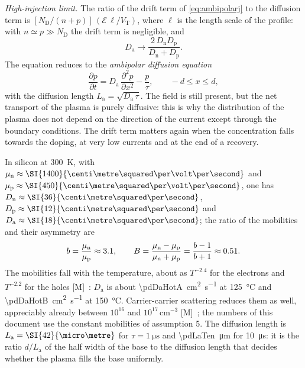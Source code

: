 \documentclass[10pt,a4paper]{scrartcl}
\newcommand{\VT}{V_\mathrm{T}}
\newcommand{\Ef}{\mathcal{E}}                 %
\newcommand{\ND}{N_\mathrm{D}}
\newcommand{\Da}{D_\mathrm{a}}
\newcommand{\La}{L_\mathrm{a}}
\newcommand{\Dn}{D_\mathrm{n}}
\newcommand{\Dp}{D_\mathrm{p}}
\newcommand{\mun}{\mu_\mathrm{n}}
\newcommand{\mup}{\mu_\mathrm{p}}
\newcommand{\cmc}{\si{\centi\metre^{-3}}}
\newcommand{\dpar}[2]{\frac{\partial #1}{\partial #2}}
\newcommand{\dparq}[2]{\frac{\partial^2 #1}{\partial #2^2}}
\begin{document}
\emph{High-injection limit.} The ratio of the drift term of \eqref{eq:ambipolarj} to the diffusion term is $[\ND/(n+p)]\,(\Ef\,\ell/\VT)$, where $\ell$ is the length scale of the profile: with $n \simeq p \gg \ND$ the drift term is negligible, and
\begin{equation}
\Da \longrightarrow \frac{2\,\Dn\Dp}{\Dn + \Dp} .
\label{eq:da}
\end{equation}
The equation reduces to the \emph{ambipolar diffusion equation}
\begin{equation}
\dpar{p}{t} = \Da\,\dparq{p}{x} - \frac{p}{\tau} , \qquad -d \leq x \leq d ,
\label{eq:diffusion}
\end{equation}
with the diffusion length $\La = \sqrt{\Da\,\tau}$. The field is still present, but the net transport of the plasma is purely diffusive: this is why the distribution of the plasma does not depend on the direction of the current except through the boundary conditions. The drift term matters again when the concentration falls towards the doping, at very low currents and at the end of a recovery.

In silicon at \SI{300}{\kelvin}, with $\mun \approx \SI{\pdMun}{\centi\metre\squared\per\volt\per\second}$ and $\mup \approx \SI{\pdMup}{\centi\metre\squared\per\volt\per\second}$, one has $\Dn \approx \SI{\pdDn}{\centi\metre\squared\per\second}$, $\Dp \approx \SI{\pdDp}{\centi\metre\squared\per\second}$ and $\Da \approx \SI{\pdDa}{\centi\metre\squared\per\second}$; the ratio of the mobilities and their asymmetry are
\begin{equation}
b = \frac{\mun}{\mup} \approx \pdBratio , \qquad B = \frac{\mun - \mup}{\mun + \mup} = \frac{b-1}{b+1} \approx \pdBmob .
\label{eq:bdef}
\end{equation}
The mobilities fall with the temperature, about as $T^{-2.4}$ for the electrons and $T^{-2.2}$ for the holes [M]~\cite{sze}: $\Da$ is about \SI{\pdDaHotA}{\centi\metre\squared\per\second} at \SI{125}{\celsius} and \SI{\pdDaHotB}{\centi\metre\squared\per\second} at \SI{150}{\celsius}. Carrier-carrier scattering reduces them as well, appreciably already between $10^{16}$ and $10^{17}\,\cmc$ [M]~\cite{lutz}; the numbers of this document use the constant mobilities of assumption 5. The diffusion length is $\La = \SI{\pdLaOne}{\micro\metre}$ for $\tau = \SI{1}{\micro\second}$ and \SI{\pdLaTen}{\micro\metre} for \SI{10}{\micro\second}: it is the ratio $d/\La$ of the half width of the base to the diffusion length that decides whether the plasma fills the base uniformly.
\end{document}
